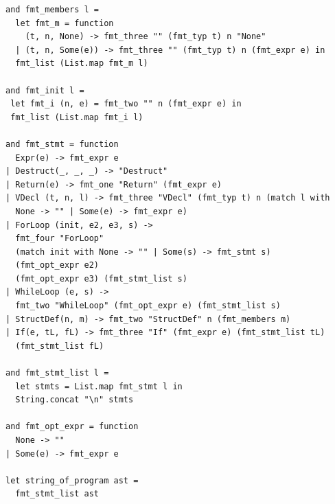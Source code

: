 \documentclass[12pt]{article}
\begin{document}
\begin{mdframed}[hidealllines=true,backgroundcolor=blue!20]
\begin{lstlisting}
and fmt_members l =
  let fmt_m = function
    (t, n, None) -> fmt_three "" (fmt_typ t) n "None"
  | (t, n, Some(e)) -> fmt_three "" (fmt_typ t) n (fmt_expr e) in
  fmt_list (List.map fmt_m l)

and fmt_init l =
 let fmt_i (n, e) = fmt_two "" n (fmt_expr e) in
 fmt_list (List.map fmt_i l)

and fmt_stmt = function
  Expr(e) -> fmt_expr e
| Destruct(_, _, _) -> "Destruct"
| Return(e) -> fmt_one "Return" (fmt_expr e)
| VDecl (t, n, l) -> fmt_three "VDecl" (fmt_typ t) n (match l with 
  None -> "" | Some(e) -> fmt_expr e)
| ForLoop (init, e2, e3, s) -> 
  fmt_four "ForLoop" 
  (match init with None -> "" | Some(s) -> fmt_stmt s)
  (fmt_opt_expr e2) 
  (fmt_opt_expr e3) (fmt_stmt_list s)
| WhileLoop (e, s) ->
  fmt_two "WhileLoop" (fmt_opt_expr e) (fmt_stmt_list s)
| StructDef(n, m) -> fmt_two "StructDef" n (fmt_members m)
| If(e, tL, fL) -> fmt_three "If" (fmt_expr e) (fmt_stmt_list tL) 
  (fmt_stmt_list fL)

and fmt_stmt_list l =
  let stmts = List.map fmt_stmt l in
  String.concat "\n" stmts

and fmt_opt_expr = function
  None -> ""
| Some(e) -> fmt_expr e

let string_of_program ast =
  fmt_stmt_list ast
\end{lstlisting}
\end{mdframed}
\end{document}
